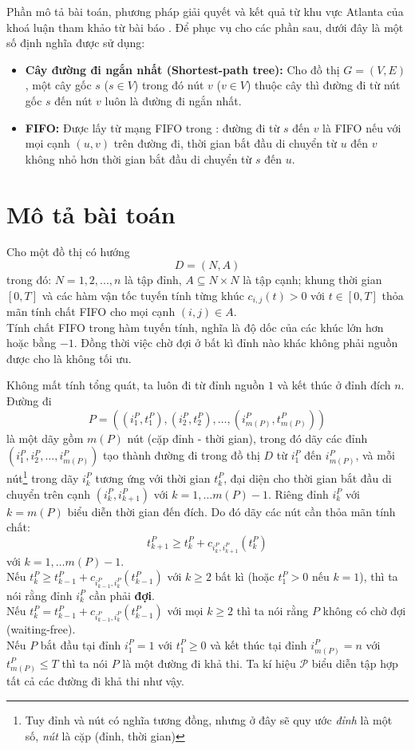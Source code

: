 \documentclass[../main.tex]{subfiles}
\begin{document}
Phần mô tả bài toán, phương pháp giải quyết và kết quả từ khu vực Atlanta của khoá luận 
tham khảo từ bài báo \cite{he2022dynamic}.
Để phục vụ cho các phần sau, dưới đây là một số định nghĩa được sử dụng: 
\begin{itemize}
  \item \textbf{Cây đường đi ngắn
nhất (Shortest-path tree):} Cho đồ thị \(G=(V,E)\), một cây gốc \(s\)
(\(s\in V\)) trong đó nút \(v\) (\(v\in V\)) thuộc cây thì đường đi từ
nút gốc \(s\) đến nút \(v\) luôn là đường đi ngắn nhất.
  \item \textbf{FIFO:} 
  Được lấy từ mạng FIFO trong \cite{dean2004shortest}: 
  đường đi từ \(s\) đến \(v\) là FIFO nếu với mọi cạnh \((u, v)\) trên đường đi, 
  thời gian bắt đầu di chuyển từ \(u\) đến \(v\) không nhỏ hơn thời gian bắt đầu di chuyển 
  từ \(s\) đến \(u\).
\end{itemize}

\section*{Mô tả bài toán}\label{problem-description}

Cho một đồ thị có hướng 
\[
  D = (N, A)
\] 
trong đó: \(N = {1, 2, ..., n}\)
là tập đỉnh, \(A \subseteq N \times N\) là tập cạnh; khung thời gian
\([0, T]\) và các hàm vận tốc tuyến tính từng khúc
\(c_{i,j}(t) > 0\) với \(t \in [0, T]\) thỏa mãn tính chất FIFO cho mọi
cạnh \((i, j) \in A\).\\
Tính chất FIFO trong hàm tuyến tính, nghĩa là
độ dốc của các khúc lớn hơn hoặc bằng \(-1\). Đồng thời việc chờ đợi ở bất kì đỉnh nào khác không phải 
nguồn được cho là không tối ưu.

Không mất tính tổng
quát, ta luôn đi từ đỉnh nguồn \(1\) và kết thúc ở đỉnh đích
\(n\). Đường đi
\[
  P=((i_1^P, t_1^P), (i_2^P, t_2^P), \dots, (i_{m(P)}^P, t_{m(P)}^P))
\]
là một dãy gồm \(m(P)\) nút (cặp đỉnh - thời gian), trong đó dãy các đỉnh
\((i_1^P, i_2^P, \dots, i_{m(P)}^P)\) tạo thành đường đi trong đồ thị
\(D\) từ \(i_1^P\) đến \(i_{m(P)}^P\), và mỗi nút\footnote{Tuy đỉnh và nút có nghĩa tương đồng, nhưng ở đây sẽ quy ước \emph{đỉnh} là một số, \emph{nút} là cặp (đỉnh, thời gian)} trong dãy \(i_k^P\)
tương ứng với thời gian \(t_k^P\), đại diện cho thời gian bắt đầu di
chuyển trên cạnh \((i_k^P, i_{k+1}^P)\) với \(k=1, \dots m(P)-1\). Riêng
đỉnh \(i_k^P\) với \(k=m(P)\) biểu diễn thời gian đến đích. Do đó dãy
các nút cần thỏa mãn tính chất:
\[t_{k+1}^P \ge t_k^P + c_{i_k^P, i_{k+1}^P}(t_k^P)\] với
\(k=1, \dots m(P)-1\). \\
Nếu
\(t_{k}^P \ge t_{k-1}^P + c_{i_{k-1}^P, i_{k}^P}(t_{k-1}^P)\) với \(k \ge 2\) bất kì 
(hoặc \(t_1^P > 0\) nếu \(k=1\)), thì ta nói rằng đỉnh \(i_k^P\)
cần phải \textbf{đợi}.\\ 
Nếu \(t_{k}^P = t_{k-1}^P + c_{i_{k-1}^P, i_{k}^P}(t_{k-1}^P)\) với mọi
\(k \ge 2\) thì ta nói rằng \(P\) không có chờ đợi (waiting-free). \\
Nếu \(P\) bắt đầu tại đỉnh \(i_1^P = 1\) với \(t_1^P\ge0\) và kết thúc tại
đỉnh \(i_{m(P)}^P=n\) với \(t_{m(P)}^P \le T\) thì ta nói \(P\) là một
đường đi khả thi. Ta kí hiệu \(\mathcal{P}\) biểu diễn tập hợp tất cả các
đường đi khả thi như vậy.
\end{document}
